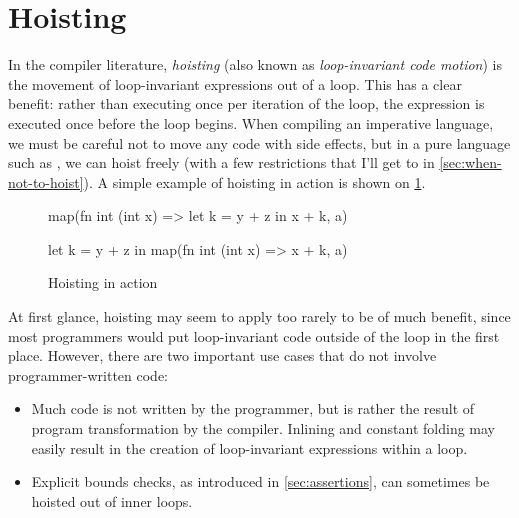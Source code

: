 \section{Hoisting}
\label{sec:hoisting}

In the compiler literature, \textit{hoisting} (also known as
\textit{loop-invariant code motion}) is the movement of loop-invariant
expressions out of a loop.  This has a clear benefit: rather than
executing once per iteration of the loop, the expression is executed
once before the loop begins.  When compiling an imperative language,
we must be careful not to move any code with side effects, but in a
pure language such as \LO{}, we can hoist freely (with a few
restrictions that I'll get to in \cref{sec:when-not-to-hoist}).  A
simple example of hoisting in action is shown on
\cref{fig:simple-hoisting}.

\begin{figure}
\begin{center}
\begin{bcolorcode}
map(fn int (int x) =>
      let k = y + z in
      x + k,
    a)
\end{bcolorcode}
\hspace{1cm}
%
\hspace{1cm}
\begin{bcolorcode}
let k = y + z in
map(fn int (int x) =>
      x + k,
    a)
\end{bcolorcode}
\end{center}

\caption{Hoisting in action}
\label{fig:simple-hoisting}
\end{figure}

At first glance, hoisting may seem to apply too rarely to be of much
benefit, since most programmers would put loop-invariant code outside
of the loop in the first place.  However, there are two important use
cases that do not involve programmer-written code:

\begin{itemize}
\item Much \LO{} code is not written by the programmer, but is rather
  the result of program transformation by the compiler.  Inlining and
  constant folding may easily result in the creation of loop-invariant
  expressions within a loop.

\item Explicit bounds checks, as introduced in \cref{sec:assertions},
  can sometimes be hoisted out of inner loops.
\end{itemize}

